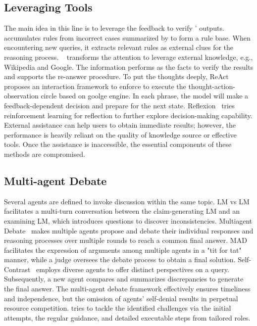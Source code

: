 \subsection{Leveraging Tools}
The main idea in this line is to leverage the feedback to verify \llm' outputs.
\tran~\cite{DBLP:conf/emnlp/YangLL23} accumulates rules from incorrect cases summarized by \llm to form a rule base. When encountering new queries, it extracts relevant rules as external clues for the reasoning process. 
\ve~\cite{DBLP:conf/acl/ZhaoLJQB23} transforms the attention to leverage external knowledge, e.g., Wikipedia and Google. The information performs as the facts to verify the results and supports the re-answer procedure.
To put the thoughts deeply, {ReAct}~\cite{DBLP:conf/iclr/YaoZYDSN023} proposes an interaction framework to enforce \llm to execute the thought-action-observation circle based on goolge engine. In each phrase, the model will make a feedback-dependent decision and prepare for the next state.
{Reflexion}~\cite{DBLP:conf/nips/ShinnCGNY23} tries reinforcement learning for reflection to further explore decision-making capability.
External assistance can help users to obtain immediate results; however, the performance is heavily reliant on the quality of knowledge source or effective tools. 
Once the assistance is inaccessible, the essential components of these methods are compromised.

\subsection{Multi-agent Debate}
Several agents are defined to invoke discussion within the same topic.
LM vs LM~\cite{DBLP:conf/emnlp/CohenHGG23} facilitates a multi-turn conversation between the claim-generating LM and an examining LM, which introduces questions to discover inconsistencies.
Multiagent Debate~\cite{DBLP:journals/corr/abs-2305-14325} makes multiple agents propose and debate their individual responses and reasoning processes over multiple rounds to reach a common final answer.
MAD~\cite{DBLP:journals/corr/abs-2305-19118} facilitates the expression of arguments among multiple agents in a "tit for tat" manner, while a judge oversees the debate process to obtain a final solution.
Self-Contrast~\cite{DBLP:conf/acl/ZhangSWPWZ024} employs diverse agents     to offer distinct perspectives on a query. Subsequently, a new agent compares and summarizes discrepancies to generate the final answer. 
The multi-agent debate framework effectively ensures timeliness and independence, but the omission of agents' self-denial results in perpetual resource competition.
\ours tries to tackle the identified challenges via the initial attempts, the regular guidance, and detailed executable steps from tailored roles.